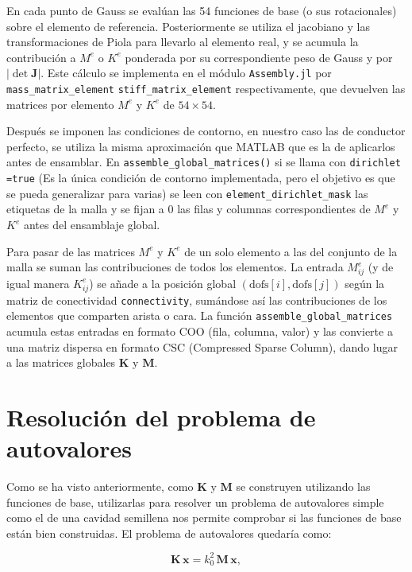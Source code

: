 \documentclass[12pt]{report} %
\begin{document}
En cada punto de Gauss se evalúan las 54 funciones de base (o sus rotacionales) sobre el elemento de referencia. Posteriormente se utiliza el jacobiano y las transformaciones de Piola para llevarlo al elemento real, y se acumula la contribución a $M^e$ o $K^e$ ponderada por su correspondiente peso de Gauss y por $|\det\mathbf{J}|$. Este cálculo se implementa en  el módulo \texttt{Assembly.jl} por \texttt{mass\_matrix\_element}  \texttt{stiff\_matrix\_element} respectivamente, que devuelven las matrices por elemento $M^e$ y $K^e$ de $54\times54$.

Después se imponen las condiciones de contorno, en nuestro caso las de conductor perfecto, se utiliza la misma aproximación que MATLAB que es la de aplicarlos antes de ensamblar.
En \texttt{assemble\_global\_matrices()} si se llama con \texttt{dirichlet =true} (Es la única condición de contorno implementada, pero el objetivo es que se pueda generalizar para varias) se leen con \texttt{element\_dirichlet\_mask} las etiquetas de la malla y se fijan a 0 las filas y columnas correspondientes de $M^e$ y $K^e$ antes del ensamblaje global.

Para pasar de las matrices $M^e$ y $K^e$ de un solo elemento a las del conjunto de la malla se suman las contribuciones de todos los elementos. La entrada $M^e_{ij}$ (y de igual manera $K^e_{ij}$) se añade a la posición global $(\mathrm{dofs}[i], \mathrm{dofs}[j])$ según la matriz de conectividad \texttt{connectivity}, sumándose así las contribuciones de los elementos que comparten arista o cara. La función \texttt{assemble\_global\_matrices} acumula estas entradas en formato COO (fila, columna, valor) y las convierte a una matriz dispersa en formato CSC (Compressed Sparse Column), dando lugar a las matrices globales $\mathbf{K}$ y $\mathbf{M}$.

\section{Resolución del problema de autovalores}\label{sec:autovalores}
Como se ha visto anteriormente, como $\mathbf{K}$ y $\mathbf{M}$ se construyen utilizando las funciones de base, utilizarlas para resolver un problema de autovalores simple como el de una cavidad semillena nos permite comprobar si las funciones de base están bien construidas. El problema de autovalores quedaría como:

\begin{equation}\label{eq:autovalores}
	\mathbf{K}\,\mathbf{x} = k_0^2\, \mathbf{M}\,\mathbf{x},
\end{equation}
\end{document}
